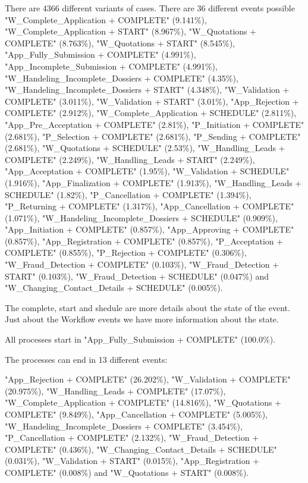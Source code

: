 There are 4366 different variants of cases. There are 36 different events possible 
"W\_Complete\_Application + COMPLETE" (9.141\%), "W\_Complete\_Application + START" (8.967\%), "W\_Quotations + COMPLETE" (8.763\%), "W\_Quotations + START" (8.545\%), "App\_Fully\_Submission + COMPLETE" (4.991\%), "App\_Incomplete\_Submission + COMPLETE" (4.991\%), "W\_Handeling\_Incomplete\_Dossiers + COMPLETE" (4.35\%), "W\_Handeling\_Incomplete\_Dossiers + START" (4.348\%), "W\_Validation + COMPLETE" (3.011\%), "W\_Validation + START" (3.01\%), "App\_Rejection + COMPLETE" (2.912\%), "W\_Complete\_Application + SCHEDULE" (2.811\%), "App\_Pre\_Acceptation + COMPLETE" (2.81\%), "P\_Initiation + COMPLETE" (2.681\%), "P\_Selection + COMPLETE" (2.681\%), "P\_Sending + COMPLETE" (2.681\%), "W\_Quotations + SCHEDULE" (2.53\%), "W\_Handling\_Leads + COMPLETE" (2.249\%), "W\_Handling\_Leads + START" (2.249\%), "App\_Acceptation + COMPLETE" (1.95\%), "W\_Validation + SCHEDULE" (1.916\%), "App\_Finalization + COMPLETE" (1.913\%), "W\_Handling\_Leads + SCHEDULE" (1.82\%), "P\_Cancellation + COMPLETE" (1.394\%), "P\_Returning + COMPLETE" (1.317\%), "App\_Cancellation + COMPLETE" (1.071\%), "W\_Handeling\_Incomplete\_Dossiers + SCHEDULE" (0.909\%), "App\_Initiation + COMPLETE" (0.857\%), "App\_Approving + COMPLETE" (0.857\%), "App\_Registration + COMPLETE" (0.857\%), "P\_Acceptation + COMPLETE" (0.855\%), "P\_Rejection + COMPLETE" (0.306\%), "W\_Fraud\_Detection + COMPLETE" (0.103\%), "W\_Fraud\_Detection + START" (0.103\%), "W\_Fraud\_Detection + SCHEDULE" (0.047\%) and "W\_Changing\_Contact\_Details + SCHEDULE" (0.005\%).

The complete, start and shedule are more details about the state of the event. Just about the Workflow events we have more information about the state. 

All processes start in "App\_Fully\_Submission + COMPLETE" (100.0\%).

The processes can end in 13 different events:

"App\_Rejection + COMPLETE" (26.202\%), "W\_Validation + COMPLETE" (20.975\%), "W\_Handling\_Leads + COMPLETE" (17.07\%), "W\_Complete\_Application + COMPLETE" (14.816\%), "W\_Quotations + COMPLETE" (9.849\%), "App\_Cancellation + COMPLETE" (5.005\%), "W\_Handeling\_Incomplete\_Dossiers + COMPLETE" (3.454\%), "P\_Cancellation + COMPLETE" (2.132\%), "W\_Fraud\_Detection + COMPLETE" (0.436\%), "W\_Changing\_Contact\_Details + SCHEDULE" (0.031\%), "W\_Validation + START" (0.015\%), "App\_Registration + COMPLETE" (0.008\%) and "W\_Quotations + START" (0.008\%).

